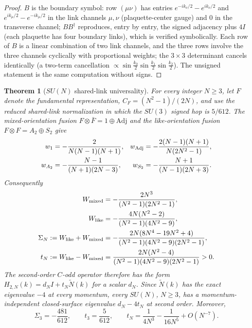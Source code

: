 \documentclass[11pt]{article}
\newtheorem{theorem}{Theorem}[section]
\newcommand{\Nt}{\widetilde N}
\begin{document}
\begin{proof}
$B$ is the boundary symbol: row $(\mu\nu)$ has entries
$e^{-ik_\nu/2}-e^{ik_\nu/2}$ and $e^{ik_\mu/2}-e^{-ik_\mu/2}$ in the link
channels $\mu,\nu$ (plaquette-center gauge) and $0$ in the transverse
channel; $BB^\dagger$ reproduces, entry by entry, the signed adjacency plus
$4I$ (each plaquette has four boundary links), which is verified symbolically.
Each row of $B$ is a linear combination of two link channels, and the three
rows involve the three channels cyclically with proportional weights; the
$3\times3$ determinant cancels identically (a two-term cancellation
$\propto \sin\tfrac{k_0}{2}\sin\tfrac{k_1}{2}\sin\tfrac{k_2}{2}$). The unsigned statement is the
same computation without signs.
\end{proof}

\begin{theorem}[$SU(N)$ shared-link universality]\label{thm:suniversal}
For every integer $N\geq3$, let $F$ denote the fundamental representation,
$C_F=(N^2-1)/(2N)$, and use the reduced shared-link normalization in which
the $SU(3)$ signed hop is $5/612$. The mixed-orientation fusion
$F\otimes\bar F=1\oplus\mathrm{Adj}$ and the like-orientation fusion
$F\otimes F=A_2\oplus S_2$ give
\begin{align}
w_1&=-\frac{2}{N(N-1)(N+1)},&
w_{\mathrm{Adj}}&=-\frac{2(N-1)(N+1)}{N(2N^2-1)},\notag\\
w_{A_2}&=-\frac{N-1}{(N+1)(2N-3)},&
w_{S_2}&=-\frac{N+1}{(N-1)(2N+3)}.
\label{eq:sunweights}
\end{align}
Consequently
\begin{align}
W_{\mathrm{mixed}}&=-\frac{2N^3}{(N^2-1)(2N^2-1)},\notag\\
W_{\mathrm{like}}&=-\frac{4N(N^2-2)}{(N^2-1)(4N^2-9)},\notag\\
\Sigma_N:=W_{\mathrm{like}}+W_{\mathrm{mixed}}
&=-\frac{2N(8N^4-19N^2+4)}{(N^2-1)(4N^2-9)(2N^2-1)},\notag\\
t_N:=W_{\mathrm{like}}-W_{\mathrm{mixed}}
&=\frac{2N(N^2-4)}{(N^2-1)(4N^2-9)(2N^2-1)}>0.
\label{eq:suntn}
\end{align}
The second-order $C$-odd operator therefore has the form
$H_{2,N}(k)=d_NI+t_N\Nt(k)$ for a scalar $d_N$. Since
$\Nt(k)$ has the exact eigenvalue $-4$ at every momentum, every $SU(N)$,
$N\geq3$, has a momentum-independent closed-surface eigenvalue
$d_N-4t_N$ at second order. Moreover,
\[
\Sigma_3=-\frac{481}{612},\qquad t_3=\frac5{612},\qquad
t_N=\frac{1}{4N^3}-\frac{1}{16N^5}+O(N^{-7}).
\]
\end{theorem}
\end{document}
